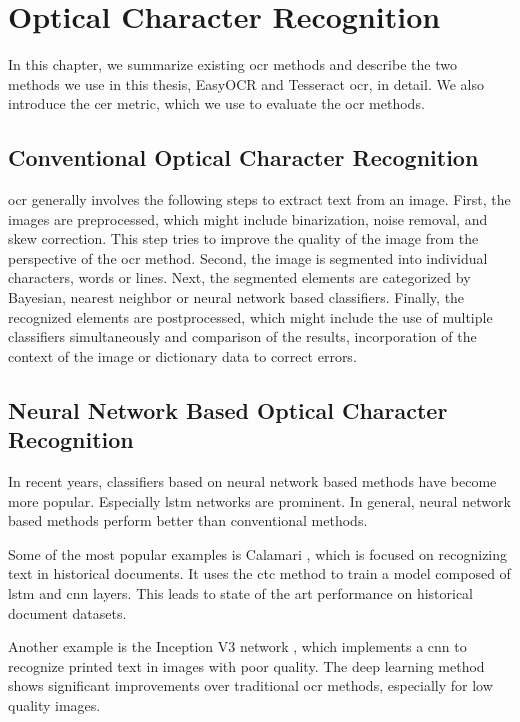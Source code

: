 \chapter{Optical Character Recognition}
\label{chap:ocr}

In this chapter, we summarize existing \gls{ocr} methods and describe the two methods we use in this thesis, EasyOCR and Tesseract \gls{ocr}, in detail.
We also introduce the \gls{cer} metric, which we use to evaluate the \gls{ocr} methods.

\section{Conventional Optical Character Recognition}

\Gls{ocr} \cite{ocr_survey_2017} generally involves the following steps to extract text from an image.
First, the images are preprocessed, which might include binarization, noise removal, and skew correction.
This step tries to improve the quality of the image from the perspective of the \gls{ocr} method.
Second, the image is segmented into individual characters, words or lines.
Next, the segmented elements are categorized by Bayesian, nearest neighbor or neural network based classifiers.
Finally, the recognized elements are postprocessed, which might include the use of multiple classifiers simultaneously and comparison of the results, incorporation of the context of the image or dictionary data to correct errors.

\section{Neural Network Based Optical Character Recognition}

In recent years, classifiers based on neural network based methods \cite{ocr_survey_lstms_2013} have become more popular.
Especially \gls{lstm} networks are prominent.
In general, neural network based methods perform better than conventional methods.

Some of the most popular examples is Calamari \cite{ocr_calamari_2018}, which is focused on recognizing text in historical documents.
It uses the \gls{ctc} method to train a model composed of \gls{lstm} and \gls{cnn} layers.
This leads to state of the art performance on historical document datasets.

Another example is the Inception V3 network \cite{ocr_improved_deep_2018}, which implements a \gls{cnn} to recognize printed text in images with poor quality.
The deep learning method shows significant improvements over traditional \gls{ocr} methods, especially for low quality images.

